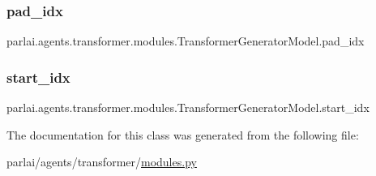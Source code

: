 \subsubsection{\texorpdfstring{pad\+\_\+idx}{pad\_idx}}
{\footnotesize\ttfamily parlai.\+agents.\+transformer.\+modules.\+Transformer\+Generator\+Model.\+pad\+\_\+idx}

\mbox{\label{classparlai_1_1agents_1_1transformer_1_1modules_1_1TransformerGeneratorModel_a381b6d63e5aba194730c36d9fb93c6d6}} 
\subsubsection{\texorpdfstring{start\+\_\+idx}{start\_idx}}
{\footnotesize\ttfamily parlai.\+agents.\+transformer.\+modules.\+Transformer\+Generator\+Model.\+start\+\_\+idx}



The documentation for this class was generated from the following file\+:\begin{DoxyCompactItemize}
\item 
parlai/agents/transformer/\hyperlink{parlai_2agents_2transformer_2modules_8py}{modules.\+py}\end{DoxyCompactItemize}
